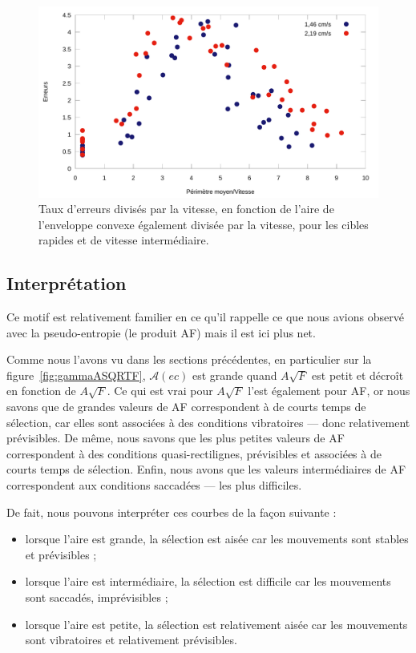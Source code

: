 	\begin{figure}[!htb]
		\centering
		\includegraphics[width=\textwidth]{figures/ch4/errorsVareaEverythingNormed}
		\caption[Taux d'erreurs/V en fonction de $\mathcal{A}(ec)/V$]{Taux d'erreurs divisés par la vitesse, en fonction de l'aire de l'enveloppe convexe également divisée par la vitesse, pour les cibles rapides et de vitesse intermédiaire.}
		\label{fig:errorsVareaEverythingNormed}
	\end{figure}

	
	\subsection{Interprétation}
	Ce motif est relativement familier en ce qu'il rappelle ce que nous avions observé avec la pseudo-entropie (le produit AF) mais il est ici plus net.
	
	Comme nous l'avons vu dans les sections précédentes, en particulier sur la figure~\ref{fig:gammaASQRTF}, $\mathcal{A}(ec)$ est grande quand $A\sqrt{F}$ est petit et décroît en fonction de $A\sqrt{F}$. Ce qui est vrai pour $A\sqrt{F}$ l'est également pour AF, or nous savons que de grandes valeurs de AF correspondent à de courts temps de sélection, car elles sont associées à des conditions vibratoires --- donc relativement prévisibles. De même, nous savons que les plus petites valeurs de AF correspondent à des conditions quasi-rectilignes, prévisibles et associées à de courts temps de sélection. Enfin, nous avons que les valeurs intermédiaires de AF correspondent aux conditions saccadées --- les plus difficiles.
	
	De fait, nous pouvons interpréter ces courbes de la façon suivante :
	\begin{itemize}
		\item lorsque l'aire est grande, la sélection est aisée car les mouvements sont stables et prévisibles ;
		\item lorsque l'aire est intermédiaire, la sélection est difficile car les mouvements sont saccadés, imprévisibles ;
		\item lorsque l'aire est petite, la sélection est relativement aisée car les mouvements sont vibratoires et relativement prévisibles.
	\end{itemize}
	

